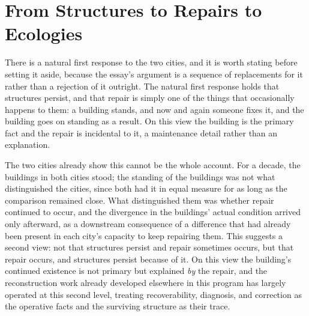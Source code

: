 \documentclass[11pt]{article}
\begin{document}
\section{From Structures to Repairs to Ecologies}\label{sec:reframe}

There is a natural first response to the two cities, and it is worth
stating before setting it aside, because the essay's argument is a
sequence of replacements for it rather than a rejection of it outright.
The natural first response holds that structures persist, and that
repair is simply one of the things that occasionally happens to them:
a building stands, and now and again someone fixes it, and the
building goes on standing as a result. On this view the building is
the primary fact and the repair is incidental to it, a maintenance
detail rather than an explanation.

The two cities already show this cannot be the whole account. For a
decade, the buildings in both cities stood; the standing of the
buildings was not what distinguished the cities, since both had it
in equal measure for as long as the comparison remained close. What
distinguished them was whether repair continued to occur, and the
divergence in the buildings' actual condition arrived only afterward,
as a downstream consequence of a difference that had already been
present in each city's capacity to keep repairing them. This suggests
a second view: not that structures persist and repair sometimes
occurs, but that repair occurs, and structures persist because of it.
On this view the building's continued existence is not primary but
explained \emph{by} the repair, and the reconstruction work already
developed elsewhere in this program has largely operated at this
second level, treating recoverability, diagnosis, and correction as
the operative facts and the surviving structure as their trace.
\end{document}
